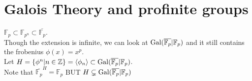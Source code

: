 \documentclass[../main.tex]{subfiles}
\begin{document}
\section{Galois Theory and profinite groups}
\begin{exemple}
$\mathbb{F}_p \subset \mathbb{F}_{p^{n}} \subset \overline{ \mathbb{F}_p}$.\\
Though the extension is infinite, we can look at $\operatorname{Gal}( \overline{\mathbb{F}_p}| \mathbb{F}_p) $ and it still contains the frobenius $ \phi( x) =x^{p}$.\\
Let $H = \left\{ \phi^{n}| n \in \mathbb{Z} \right\} = \left\langle \phi_n\right\rangle \subset \operatorname{Gal}( \overline{\mathbb{F}_p}| \mathbb{F}_p) $.\\
Note that $ \overline{\mathbb{F}_p}^{H}= \mathbb{F}_p$ BUT $H \subsetneq \operatorname{Gal}( \overline{\mathbb{F}_p}| \mathbb{F}_p) $ 
\end{exemple}
\end{document}

